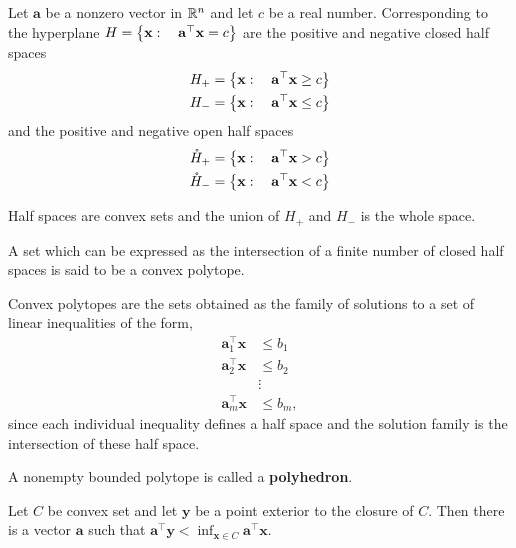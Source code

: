 \begin{definition}
	Let $\mathbf{a}$ be a nonzero vector in $\mathbb{R}^n$ and let $c$ be a real number. Corresponding to the hyperplane $H=\left\lbrace \mathbf{x}:\quad \mathbf{a}^\top \mathbf{x}=c \right\rbrace$ are the positive and negative closed half spaces 
	\begin{align*}
		H_+ = \left\lbrace \mathbf{x}:\quad \mathbf{a}^\top \mathbf{x}\geq c \right\rbrace\\
		H_- = \left\lbrace \mathbf{x}:\quad \mathbf{a}^\top \mathbf{x}\leq c \right\rbrace
	\end{align*}
	and the positive and negative open half spaces
	\begin{align*}
	\mathring{H}_+ = \left\lbrace \mathbf{x}:\quad \mathbf{a}^\top \mathbf{x}> c \right\rbrace\\
	\mathring{H}_- = \left\lbrace \mathbf{x}:\quad \mathbf{a}^\top \mathbf{x}< c \right\rbrace
	\end{align*}
\end{definition}

Half spaces are convex sets and the union of $H_+$ and $H_-$ is the whole space.


\begin{definition}
	A set which can be expressed as the intersection of a finite number of closed half spaces is said to be a convex polytope.
\end{definition}

Convex polytopes are the sets obtained as the family of solutions to a set of linear inequalities of the form,
\begin{align*}
	\mathbf{a}_1^\top \mathbf{x}&\leq b_1 \\
	\mathbf{a}_2^\top \mathbf{x}&\leq b_2 \\
	&\vdots \\
	\mathbf{a}_m^\top \mathbf{x}&\leq b_m,
\end{align*}
since each individual inequality defines a half space and the solution family is the intersection of these half space. 

\begin{definition}
A nonempty bounded polytope is called a \textbf{polyhedron}.
\end{definition}

\begin{theorem}
Let $C$ be convex set and let $\mathbf{y}$ be a point exterior to the closure of $C$. Then there is a vector $\mathbf{a}$ such that $\mathbf{a}^\top \mathbf{y}<\inf_{\mathbf{x}\in C} \mathbf{a}^\top \mathbf{x}$.
\end{theorem}

